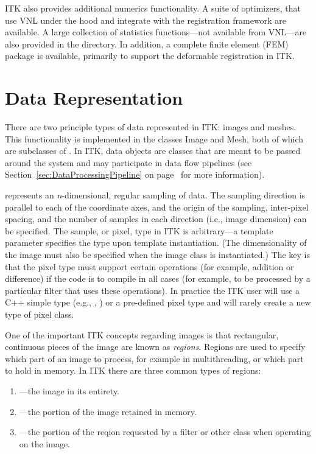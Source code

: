 ITK also provides additional numerics functionality. A suite of optimizers, that
use VNL under the hood and integrate with the registration framework
are available. A large collection of statistics functions---not available from
VNL---are also provided in the 
directory. In addition, a complete finite element (FEM) package is available,
primarily to support the deformable registration in ITK.


\section{Data Representation}
\label{sec:DataRepresentationAndAccess}


There are two principle types of data represented in ITK: images and
meshes. This functionality is implemented in the classes 
Image and Mesh, both of which are subclasses of
. In ITK, data objects are classes that are meant to
be passed around the system and may participate in data flow pipelines (see
Section~\ref{sec:DataProcessingPipeline} on
page~\pageref{sec:DataProcessingPipeline} for more information).



 represents an \emph{n}-dimensional, regular sampling of
data. The sampling direction is parallel to each of the coordinate axes, and
the origin of the sampling, inter-pixel spacing, and the number of samples in
each direction (i.e., image dimension) can be specified. The sample, or
pixel, type in ITK is arbitrary---a template parameter 
specifies the type upon template instantiation. (The dimensionality of the
image must also be specified when the image class is instantiated.) The key
is that the pixel type must support certain operations (for example, addition
or difference) if the code is to compile in all cases (for example, to be
processed by a particular filter that uses these operations). In practice the
ITK user will use a C++ simple type (e.g., , ) or a pre-defined pixel
type and will rarely create a new type of pixel class.

One of the important ITK concepts regarding images is that rectangular,
continuous pieces of the image are known as \emph{regions}. Regions are used
to specify which part of an image to process, for example in multithreading,
or which part to hold in memory. In ITK there are three common types of
regions:
\begin{enumerate}
\item {}---the image in its entirety.
\item {}---the portion of the image retained in memory.
\item {}---the portion of the reqion requested by a 
filter or other class when operating on the image.
\end{enumerate}

